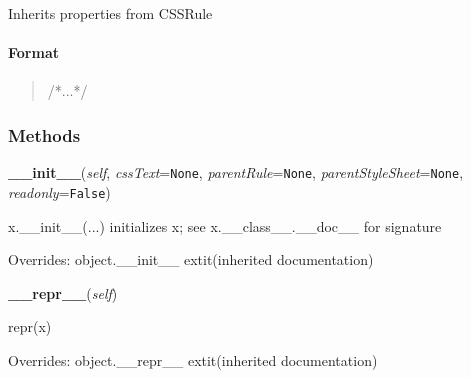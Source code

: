 Inherits properties from CSSRule



\hypertarget{format}{}
\paragraph*{Format}
\label{format}
\begin{quote}{\ttfamily \raggedright \noindent
/*...*/
}\end{quote}


  \subsubsection{Methods}

    \vspace{0.5ex}

\hspace{.8\funcindent}\begin{boxedminipage}{\funcwidth}

    \raggedright \textbf{\_\_init\_\_}(\textit{self}, \textit{cssText}={\tt None}, \textit{parentRule}={\tt None}, \textit{parentStyleSheet}={\tt None}, \textit{readonly}={\tt False})

\setlength{\parskip}{2ex}
    x.\_\_init\_\_(...) initializes x; see x.\_\_class\_\_.\_\_doc\_\_ for 
    signature

\setlength{\parskip}{1ex}
      Overrides: object.\_\_init\_\_ 	extit{(inherited documentation)}

    \end{boxedminipage}

    \vspace{0.5ex}

\hspace{.8\funcindent}\begin{boxedminipage}{\funcwidth}

    \raggedright \textbf{\_\_repr\_\_}(\textit{self})

\setlength{\parskip}{2ex}
    repr(x)

\setlength{\parskip}{1ex}
      Overrides: object.\_\_repr\_\_ 	extit{(inherited documentation)}

    \end{boxedminipage}

